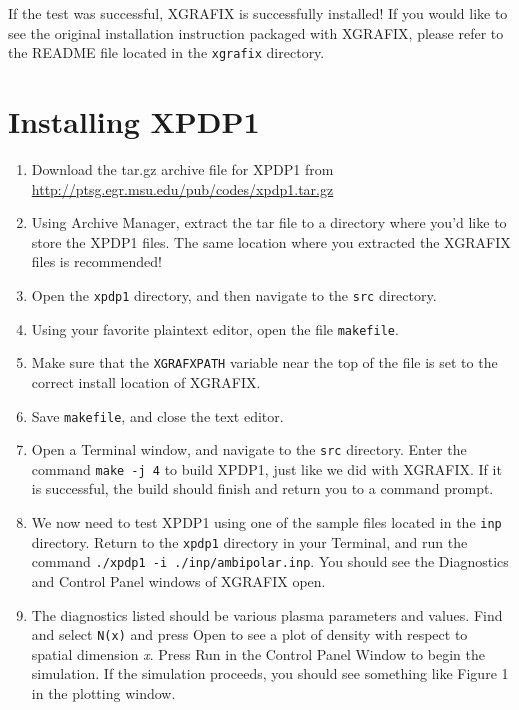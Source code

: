 \documentclass{article}
\begin{document}
	\noindent If the test was successful, XGRAFIX is successfully installed! If you would like to see the original installation instruction packaged with XGRAFIX, please refer to the README file located in the \verb|xgrafix| directory.
	
	\section{Installing XPDP1}
	
	\begin{enumerate}
		\item Download the tar.gz archive file for XPDP1 from \url{http://ptsg.egr.msu.edu/pub/codes/xpdp1.tar.gz}
		
		\item Using Archive Manager, extract the tar file to a directory where you'd like to store the XPDP1 files. The same location where you extracted the XGRAFIX files is recommended!
		
		\item Open the \verb|xpdp1| directory, and then navigate to the \verb|src| directory.
		
		\item Using your favorite plaintext editor, open the file \verb|makefile|. 
		
		\item Make sure that the \verb|XGRAFXPATH| variable near the top of the file is set to the correct install location of XGRAFIX.
		
		\item Save \verb|makefile|, and close the text editor.
		
		\item Open a Terminal window, and navigate to the \verb|src| directory. Enter the command \verb|make -j 4| to build XPDP1, just like we did with XGRAFIX. If it is successful, the build should finish and return you to a command prompt. 
		
		\item We now need to test XPDP1 using one of the sample files located in the \verb|inp| directory. Return to the \verb|xpdp1| directory in your Terminal, and run the command \verb|./xpdp1 -i ./inp/ambipolar.inp|. You should see the Diagnostics and Control Panel windows of XGRAFIX open.
		
		\item The diagnostics listed should be various plasma parameters and values. Find and select \verb|N(x)| and press Open to see a plot of density with respect to spatial dimension \textit{x}. Press Run in the Control Panel Window to begin the simulation. If the simulation proceeds, you should see something like Figure 1 in the plotting window. 
		

\end{enumerate}
\end{document}
